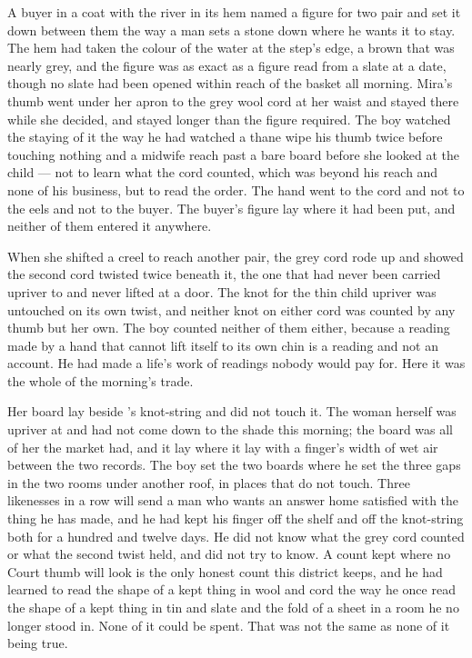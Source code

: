 \scenebreak

A buyer in a coat with the river in its hem named a figure for two pair and set it down between them the way a man sets a stone down where he wants it to stay. The hem had taken the colour of the water at the step's edge, a brown that was nearly grey, and the figure was as exact as a figure read from a slate at a date, though no slate had been opened within reach of the basket all morning. Mira's thumb went under her apron to the grey wool cord at her waist and stayed there while she decided, and stayed longer than the figure required. The boy watched the staying of it the way he had watched a thane wipe his thumb twice before touching nothing and a midwife reach past a bare board before she looked at the child --- not to learn what the cord counted, which was beyond his reach and none of his business, but to read the order. The hand went to the cord and not to the eels and not to the buyer. The buyer's figure lay where it had been put, and neither of them entered it anywhere.

When she shifted a creel to reach another pair, the grey cord rode up and showed the second cord twisted twice beneath it, the one that had never been carried upriver to  and never lifted at a door. The knot for the thin child upriver was untouched on its own twist, and neither knot on either cord was counted by any thumb but her own. The boy counted neither of them either, because a reading made by a hand that cannot lift itself to its own chin is a reading and not an account. He had made a life's work of readings nobody would pay for. Here it was the whole of the morning's trade.

Her board lay beside 's knot-string and did not touch it. The woman herself was upriver at  and had not come down to the shade this morning; the board was all of her the market had, and it lay where it lay with a finger's width of wet air between the two records. The boy set the two boards where he set the three gaps in the two rooms under another roof, in places that do not touch. Three likenesses in a row will send a man who wants an answer home satisfied with the thing he has made, and he had kept his finger off the shelf and off the knot-string both for a hundred and twelve days. He did not know what the grey cord counted or what the second twist held, and did not try to know. A count kept where no Court thumb will look is the only honest count this district keeps, and he had learned to read the shape of a kept thing in wool and cord the way he once read the shape of a kept thing in tin and slate and the fold of a sheet in a room he no longer stood in. None of it could be spent. That was not the same as none of it being true.

